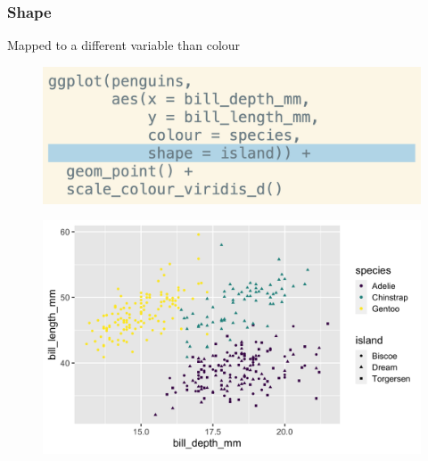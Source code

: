 \documentclass[11pt]{beamer}
\begin{document}
\begin{frame}
	\frametitle{\textbf{Shape}}
	Mapped to a different variable than colour
	
	\begin{minipage}[t]{0.5\linewidth}
		\begin{figure}
			\centering
			\includegraphics[width=1\linewidth]{Images/S2/code/s19}
			
		\end{figure}
	\end{minipage}%
	\begin{minipage}[t]{0.5\linewidth}
		
		\begin{figure}
			\centering
			\includegraphics[width=1\linewidth]{Images/S2/shape-island-1}
			
		\end{figure}
		
		
	\end{minipage}
	
	
\end{frame}
\end{document}
